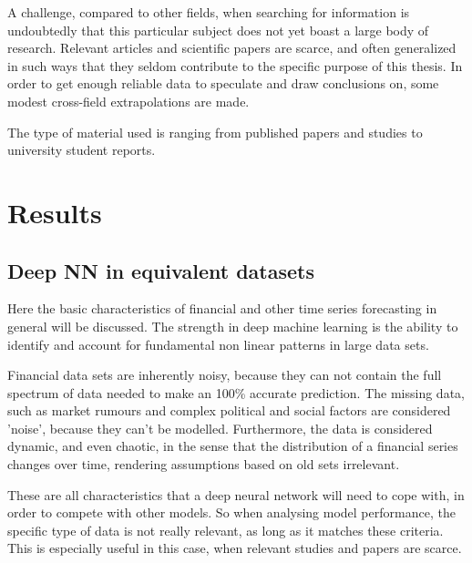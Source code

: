 
A challenge, compared to other fields, when searching for information is undoubtedly that this particular subject does not yet boast a large body of research. Relevant articles and scientific papers are scarce, and often generalized in such ways that they seldom contribute to the specific purpose of this thesis. In order to get enough reliable data to speculate and draw conclusions on, some modest cross-field extrapolations are made.

The type of material used is ranging from published papers and studies to university student reports.



\newpage

\section{Results}
\subsection{Deep NN in equivalent datasets}

Here the basic characteristics of financial and other time series forecasting in general will be discussed.
The strength in deep machine learning is the ability to identify and account for fundamental non linear patterns in large data sets.

Financial data sets are inherently noisy, because they can not contain the full spectrum of data needed to make an 100\% accurate prediction. The missing data, such as market rumours and complex political and social factors are considered 'noise', because they can't be modelled. Furthermore, the data is considered dynamic, and even chaotic, in the sense that the distribution of a financial series changes over time, rendering assumptions based on old sets irrelevant. 

These are all characteristics that a deep neural network will need to cope with, in order to compete with other models. So when analysing model performance, the  specific type of data is not really relevant, as long as it matches these criteria. This is especially useful in this case, when relevant studies and papers are scarce.

